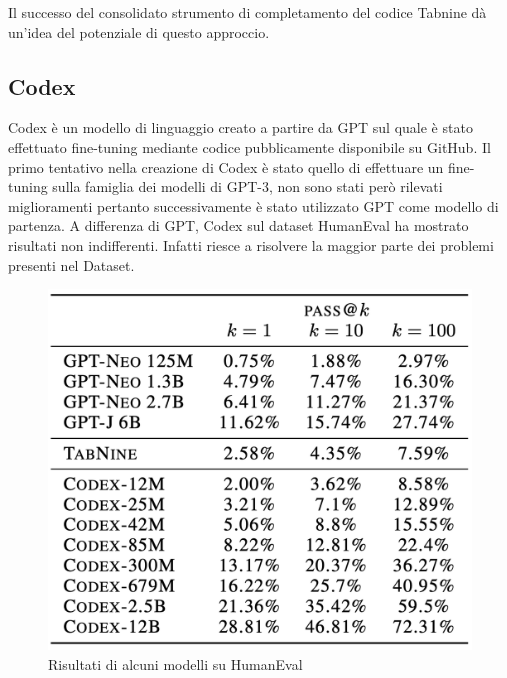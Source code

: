 Il successo del consolidato strumento di completamento del codice Tabnine dà un'idea del potenziale di questo approccio. \cite{finkbeiner2021kunstliche}
\subsection{Codex}
Codex è un modello di linguaggio creato a partire da GPT sul quale è stato effettuato fine-tuning mediante codice pubblicamente disponibile su GitHub.
Il primo tentativo nella creazione di Codex è stato quello di effettuare un fine-tuning sulla famiglia dei modelli di GPT-3, non sono stati però rilevati miglioramenti pertanto successivamente è stato utilizzato GPT come modello di partenza. A differenza di GPT, Codex sul dataset HumanEval ha mostrato risultati non indifferenti. Infatti riesce a risolvere la maggior parte dei problemi presenti nel Dataset.
\begin{figure}[h!]
\centerline{\includegraphics[scale=.40]{immagini/humaneval_results.png}}
\caption{Risultati di alcuni modelli su HumanEval}
\label{fig_humaneval}
\end{figure}

